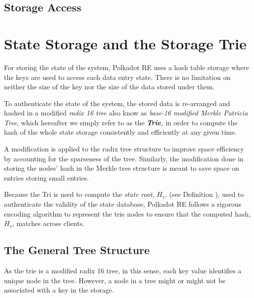 \documentclass{article}
\newcommand{\tmem}[1]{{\em #1\/}}
\newcommand{\tmstrong}[1]{\textbf{#1}}
\begin{document}
\subsection{Storage Access}

\section{State Storage and the Storage Trie}

For storing the state of the system, Polkadot RE uses a hash table storage
where the keys are used to access each data entry state. There is no
limitation on neither the size of the key nor the size of the data stored
under them. \

To authenticate the state of the system, the stored data is re-arranged and
hashed in a modified {\tmem{radix 16 tree}} also know as {\tmem{base-16
modified Merkle Patricia Tree}}, which hereafter we simply refer to as the
{\tmem{{\tmstrong{Trie}},}} in order to compute the hash of the whole state
storage consistently and efficiently at any given time.

A modification is applied to the radix tree structure to improve space
efficiency by accounting for the sparseness of the tree. Similarly,
the modification done in storing the nodes' hash in the Merkle tree structure is meant to save space on entries storing small entries.

Because the Tri is used to compute the {\tmem{state root}}, $H_r$, (see
Definition \label{def_block_header} ), used to authenticate the
validity of the state database, Polkadot RE follows a rigorous encoding
algorithm to represent the trie nodes to ensure that the computed hash, $H_r$,
matches across clients.

\subsection{The General Tree Structure}

As the trie is a modified radix 16 tree, in this sense, each key value
identifies a unique node in the tree. However, a node in a tree might or might not be associated with a key in the storage.
\end{document}

